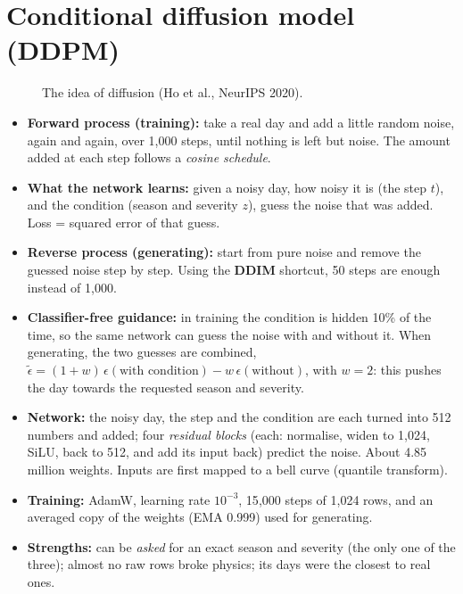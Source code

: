 \section{Conditional diffusion model (DDPM)}
\begin{figure}[H]
\centering
{}
\caption{The idea of diffusion (Ho et al., NeurIPS 2020).}
\end{figure}
\begin{itemize}
  \item \textbf{Forward process (training):} take a real day and add a little random noise, again and again, over
        1{,}000 steps, until nothing is left but noise. The amount added at each step follows a \emph{cosine
        schedule}.
  \item \textbf{What the network learns:} given a noisy day, how noisy it is (the step $t$), and the condition (season
        and severity $z$), guess the noise that was added. Loss = squared error of that guess.
  \item \textbf{Reverse process (generating):} start from pure noise and remove the guessed noise step by step. Using
        the \textbf{DDIM} shortcut, 50 steps are enough instead of 1{,}000.
  \item \textbf{Classifier-free guidance:} in training the condition is hidden 10\% of the time, so the same network
        can guess the noise with and without it. When generating, the two guesses are combined,
        $\tilde\epsilon=(1+w)\,\epsilon(\text{with condition})-w\,\epsilon(\text{without})$, with $w=2$: this pushes
        the day towards the requested season and severity.
  \item \textbf{Network:} the noisy day, the step and the condition are each turned into 512 numbers and added; four
        \emph{residual blocks} (each: normalise, widen to 1{,}024, SiLU, back to 512, and add its input back) predict
        the noise. About 4.85 million weights. Inputs are first mapped to a bell curve (quantile transform).
  \item \textbf{Training:} AdamW, learning rate $10^{-3}$, 15{,}000 steps of 1{,}024 rows, and an averaged copy of the
        weights (EMA 0.999) used for generating.
  \item \textbf{Strengths:} can be \emph{asked} for an exact season and severity (the only one of the three); almost no
        raw rows broke physics; its days were the closest to real ones.
\end{itemize}

